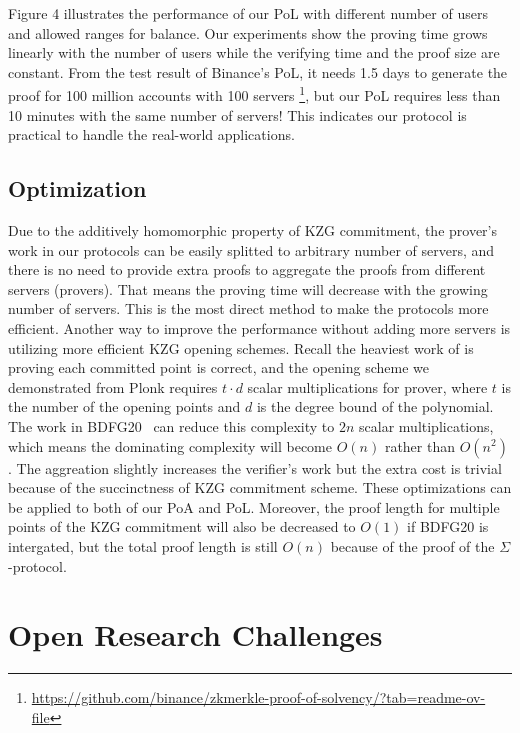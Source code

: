Figure 4 illustrates the performance of our PoL with different number of users and allowed ranges for balance. Our experiments show the proving time grows linearly with the number of users while the verifying time and the proof size are constant. From the test result of Binance's PoL, it needs 1.5 days to generate the proof for 100 million accounts with 100 servers \footnote{\url{https://github.com/binance/zkmerkle-proof-of-solvency/?tab=readme-ov-file}}, but our PoL requires less than 10 minutes with the same number of servers! This indicates our protocol is practical to handle the real-world applications.

\subsection{Optimization}
\label{sec:opt}
Due to the additively homomorphic property of KZG commitment, the prover's work in our protocols can be easily splitted to arbitrary number of servers, and there is no need to provide extra proofs to aggregate the proofs from different servers (provers). That means the proving time will decrease with the growing number of servers. This is the most direct method to make the protocols more efficient. Another way to improve the performance without adding more servers is utilizing more efficient KZG opening schemes. Recall the heaviest work of \bootstrap is proving each committed point is correct, and the opening scheme we demonstrated from Plonk requires $t\cdot{d}$ scalar multiplications for prover, where $t$ is the number of the opening points and $d$ is the degree bound of the polynomial. The work in BDFG20~\cite{bdfg} can reduce this complexity to $2n$ scalar multiplications, which means the dominating complexity will become $O(n)$ rather than $O(n^2)$. The aggreation slightly increases the verifier's work but the extra cost is trivial because of the succinctness of KZG commitment scheme. These optimizations can be applied to both of our PoA and PoL. Moreover, the proof length for multiple points of the KZG commitment will also be decreased to $O(1)$ if BDFG20 is intergated, but the total proof length is still $O(n)$ because of the proof of the $\Sigma$-protocol.





\section{Open Research Challenges}

